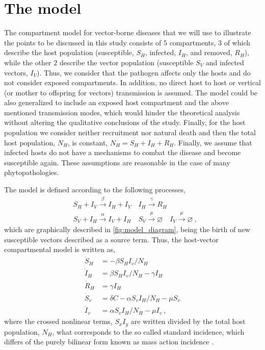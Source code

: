 \section{The model}\label{sec:model}

The compartment model for vector-borne diseases that we will use to
illustrate the points to be discussed in this study consists of $5$
compartments, $3$ of which describe the host population (susceptible, $S_H$,
infected, $I_H$, and removed, $R_H$), while the other $2$ describe the vector
population (susceptible $S_V$ and infected vectors, $I_V$). Thus, we consider
that the pathogen affects only the hosts and do not consider exposed
compartments. In addition, no direct host to host or vertical (or mother to
offspring for vectors) transmission is assumed. The model could be also
generalized to include an exposed host compartment and the above mentioned
transmission modes, which would hinder the theoretical analysis without
altering the qualitative conclusions of the study. Finally, for the host
population we consider neither recruitment nor natural death and then the total
host population, $N_H$, is constant, $N_H=S_H+I_H+R_H$. Finally, we assume that
infected hosts do not have a mechanisms to combat the disease and become
susceptible again. These assumptions are reasonable in the case of many
phytopathologies.

The model is defined according to the following processes,
\begin{equation}\label{eq:scheme_infection}
    \begin{aligned}
         & S_H+I_V \stackrel{\beta}{\rightarrow} I_H + I_V \quad I_H
        \stackrel{\gamma}{\rightarrow} R_H                           \\
         & S_V+I_H \stackrel{\alpha}{\rightarrow} I_V+I_H \quad S_V
        \stackrel{\mu}{\rightarrow} \varnothing \quad I_V
        \stackrel{\mu}{\rightarrow}
        \varnothing
        \ ,
    \end{aligned}
\end{equation}
which are graphically described in \cref{fig:model_diagram}, being the
birth of new susceptible vectors described as a source term.
Thus, the host-vector compartmental model is written as,
\begin{equation}\label{eq:SIR_v}
    \begin{aligned}
        \dot{S}_H & =-\beta S_H I_v / N_H                     \\
        \dot{I}_H & =\beta S_H I_v / N_H - \gamma I_H         \\
        \dot{R}_H & =\gamma I_H                               \\
        \dot{S}_v & = \delta C-\alpha S_v I_H / N_H - \mu S_v \\
        \dot{I}_v & =\alpha S_v I_H / N_H - \mu I_v \ ,
    \end{aligned}
\end{equation}
where the crossed nonlinear terms, $S_x I_y$ are written divided by the
total host population, $N_H$, what corresponds to the so called standard
incidence, which differs of the purely bilinear form known as mass action
incidence \cite{MartchevaBook}.

